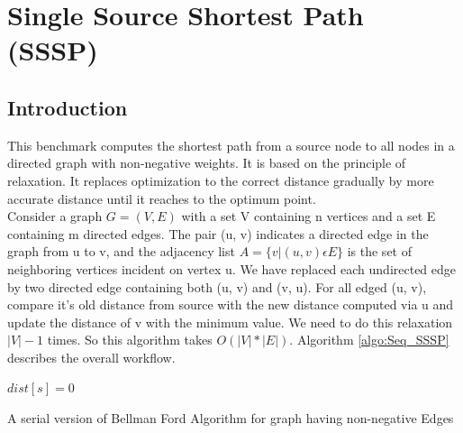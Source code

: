 \documentclass{article}
\begin{document}



\section{Single Source Shortest Path (SSSP)}
\subsection{Introduction}

This benchmark computes the shortest path from a source node to all nodes in a directed graph with non-negative weights. It is based on the principle of relaxation. It replaces optimization to the correct distance gradually by more accurate distance until it reaches to the optimum point. \\

Consider a graph $G = (V, E)$ with a set V containing n vertices and a set E containing m directed edges. The pair (u, v) indicates a directed edge in the graph from u to v, and the adjacency list $A = \{ v | (u, v) \epsilon E \}$ is the set of neighboring vertices incident on vertex u. We have replaced each undirected edge by two directed edge containing both (u, v) and (v, u). For all edged (u, v), compare it's old distance from source with the new distance computed via u and update the distance of v with the minimum value. We need to do this relaxation $|V| - 1$ times. So this algorithm takes $O(|V| * |E|)$. Algorithm \ref{algo:Seq_SSSP} describes the overall workflow. \\


\IncMargin{1em}
\begin{algorithm}
	
	\BlankLine
	\emph{$dist[s] =  0$}\;
	\BlankLine
\caption{A serial version of Bellman Ford Algorithm for graph having non-negative Edges}\label{algo:Seq_SSSP}
\end{algorithm}\DecMargin{1em}
\end{document}
